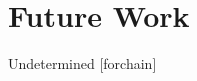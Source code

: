 \documentclass[a4paper,11pt]{article}
\begin{document}
\section{Future Work}
Undetermined [forchain] 



\clearpage



%
%


\end{document}
